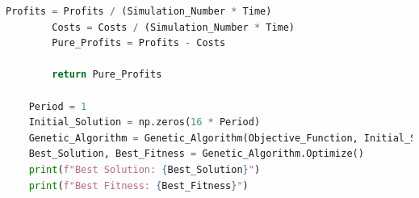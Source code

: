 \documentclass[withoutpreface,bwprint]{cumcmthesis} %
\begin{document}
\begin{appendices}
\begin{lstlisting}[language=python]
		Profits = Profits / (Simulation_Number * Time)
		Costs = Costs / (Simulation_Number * Time)
		Pure_Profits = Profits - Costs
	
		return Pure_Profits
	
	Period = 1
	Initial_Solution = np.zeros(16 * Period)
	Genetic_Algorithm = Genetic_Algorithm(Objective_Function, Initial_Solution)
	Best_Solution, Best_Fitness = Genetic_Algorithm.Optimize()
	print(f"Best Solution: {Best_Solution}")
	print(f"Best Fitness: {Best_Fitness}")
	
\end{lstlisting}
\end{appendices}
\end{document}
